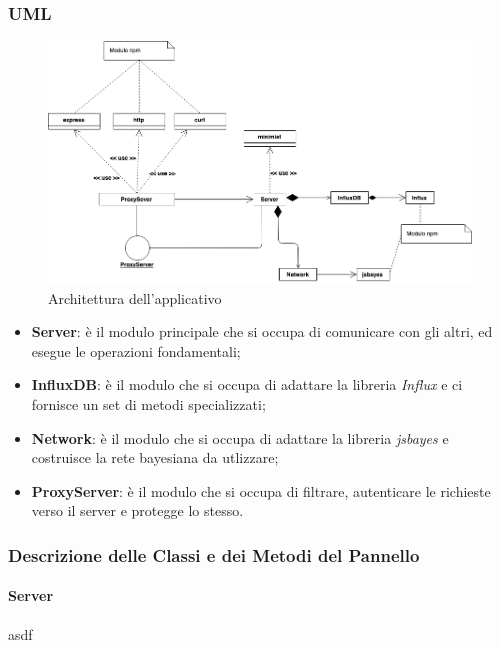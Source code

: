 \subsubsection{UML}
\begin{figure}[H]
	\begin{center}
		\includegraphics[scale=0.5]{./images/server_class_non_espanso.png} 
	\end{center}
	\caption{Architettura dell'applicativo}
\end{figure}

\begin{itemize}
 \item \textbf{Server}: è il modulo principale che si occupa di comunicare con gli altri, ed esegue le operazioni fondamentali;
 \item \textbf{InfluxDB}: è il modulo che si occupa di adattare la libreria \textit{Influx} e ci fornisce un set di metodi specializzati;
 \item \textbf{Network}: è il modulo che si occupa di adattare la libreria \textit{jsbayes} e costruisce la rete bayesiana da utlizzare;
 \item \textbf{ProxyServer}: è il modulo che si occupa di filtrare, autenticare le richieste verso il server e  protegge lo stesso.
\end{itemize}

\subsubsection{Descrizione delle Classi e dei Metodi del Pannello}

\paragraph{Server}

asdf



